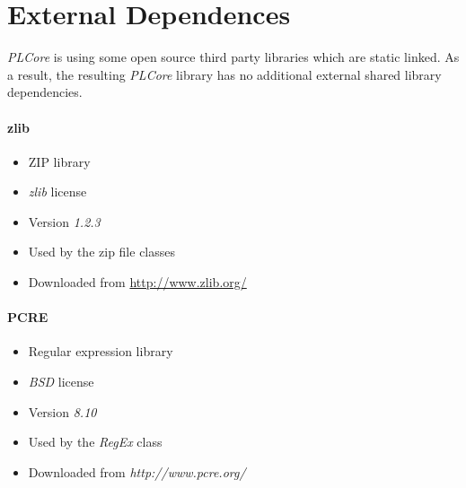 \section{External Dependences}
\emph{PLCore} is using some open source third party libraries which are static linked. As a result, the resulting \emph{PLCore} library has no additional external shared library dependencies.


\paragraph{zlib}
\begin{itemize}
\item ZIP library
\item \emph{zlib} license
\item Version \emph{1.2.3}
\item Used by the zip file classes
\item Downloaded from \url{http://www.zlib.org/}
\end{itemize}


\paragraph{PCRE}
\begin{itemize}
\item Regular expression library
\item \emph{BSD} license
\item Version \emph{8.10}
\item Used by the \emph{RegEx} class
\item Downloaded from \emph{http://www.pcre.org/}
\end{itemize}





\cleardoublepage

\cleardoublepage

\cleardoublepage

\cleardoublepage

\cleardoublepage

\cleardoublepage

\cleardoublepage

\cleardoublepage

\cleardoublepage
